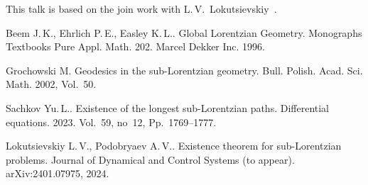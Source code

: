 \documentclass[12pt]{llncs}
\begin{document}
This talk is based on the join work with L.\,V.~Lokutsievskiy~\cite{sub-lorentzian-existence}.

\begin{thebibliography}{9}

Beem J.\,K., Ehrlich P.\,E., Easley K.\,L.. Global Lorentzian Geometry. Monographs Textbooks Pure Appl. Math. 202. Marcel Dekker Inc. 1996.

Grochowski M. Geodesics in the sub-Lorentzian geometry. Bull. Polish. Acad. Sci. Math. 2002, Vol.~50.

Sachkov Yu.\,L.. Existence of the longest sub-Lorentzian paths. Differential equations. 2023. Vol.~59, no~12, Pp.~1769--1777.

Lokutsievskiy L.\,V., Podobryaev A.\,V.. Existence theorem for sub-Lorentzian problems. Journal of Dynamical and Control Systems (to appear). arXiv:2401.07975, 2024.

\end{thebibliography}
\end{document}
